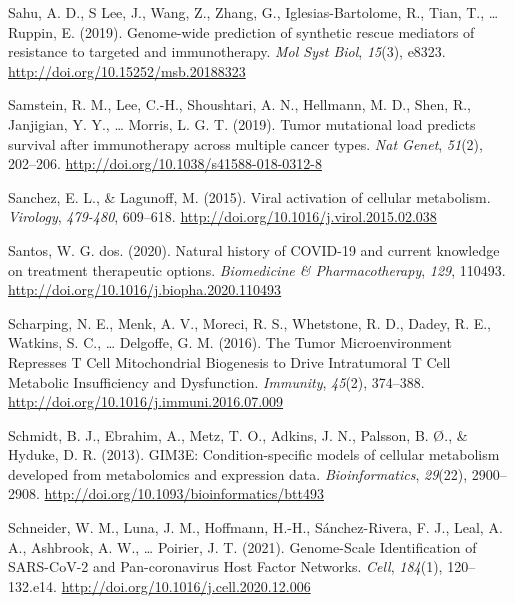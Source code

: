 \documentclass[12pt,twoside,openany,\mydriver]{thesis}  %
\begin{document}
\leavevmode\hypertarget{ref-sahu_genome-wide_2019}{}%
Sahu, A. D., S Lee, J., Wang, Z., Zhang, G., Iglesias-Bartolome, R., Tian, T., \ldots{} Ruppin, E. (2019). Genome-wide prediction of synthetic rescue mediators of resistance to targeted and immunotherapy. \emph{Mol Syst Biol}, \emph{15}(3), e8323. \url{http://doi.org/10.15252/msb.20188323}

\leavevmode\hypertarget{ref-samstein_tumor_2019}{}%
Samstein, R. M., Lee, C.-H., Shoushtari, A. N., Hellmann, M. D., Shen, R., Janjigian, Y. Y., \ldots{} Morris, L. G. T. (2019). Tumor mutational load predicts survival after immunotherapy across multiple cancer types. \emph{Nat Genet}, \emph{51}(2), 202--206. \url{http://doi.org/10.1038/s41588-018-0312-8}

\leavevmode\hypertarget{ref-sanchez_viral_2015}{}%
Sanchez, E. L., \& Lagunoff, M. (2015). Viral activation of cellular metabolism. \emph{Virology}, \emph{479-480}, 609--618. \url{http://doi.org/10.1016/j.virol.2015.02.038}

\leavevmode\hypertarget{ref-dos_santos_natural_2020}{}%
Santos, W. G. dos. (2020). Natural history of COVID-19 and current knowledge on treatment therapeutic options. \emph{Biomedicine \& Pharmacotherapy}, \emph{129}, 110493. \url{http://doi.org/10.1016/j.biopha.2020.110493}

\leavevmode\hypertarget{ref-scharping_tumor_2016}{}%
Scharping, N. E., Menk, A. V., Moreci, R. S., Whetstone, R. D., Dadey, R. E., Watkins, S. C., \ldots{} Delgoffe, G. M. (2016). The Tumor Microenvironment Represses T Cell Mitochondrial Biogenesis to Drive Intratumoral T Cell Metabolic Insufficiency and Dysfunction. \emph{Immunity}, \emph{45}(2), 374--388. \url{http://doi.org/10.1016/j.immuni.2016.07.009}

\leavevmode\hypertarget{ref-schmidt_gim3e_2013}{}%
Schmidt, B. J., Ebrahim, A., Metz, T. O., Adkins, J. N., Palsson, B. Ø., \& Hyduke, D. R. (2013). GIM3E: Condition-specific models of cellular metabolism developed from metabolomics and expression data. \emph{Bioinformatics}, \emph{29}(22), 2900--2908. \url{http://doi.org/10.1093/bioinformatics/btt493}

\leavevmode\hypertarget{ref-schneider_genome-scale_2021}{}%
Schneider, W. M., Luna, J. M., Hoffmann, H.-H., Sánchez-Rivera, F. J., Leal, A. A., Ashbrook, A. W., \ldots{} Poirier, J. T. (2021). Genome-Scale Identification of SARS-CoV-2 and Pan-coronavirus Host Factor Networks. \emph{Cell}, \emph{184}(1), 120--132.e14. \url{http://doi.org/10.1016/j.cell.2020.12.006}
\end{document}
